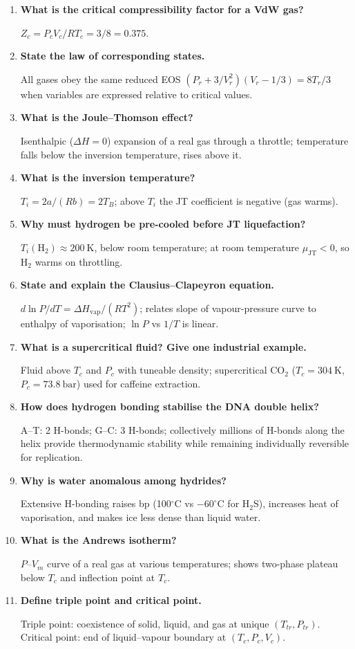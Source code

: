 \documentclass[12pt,a4paper]{article}
\newcommand{\Q}[1]{\textbf{#1}\par\noindent\ignorespaces}
\begin{document}
\begin{tcolorbox}[exambox, title={Frequently Asked / Viva Questions}]
\begin{enumerate}[topsep=0pt, label=\textbf{Q\arabic*.}, itemsep=5pt]
  \item \Q{What is the critical compressibility factor for a VdW gas?}
    $Z_c = P_cV_c/RT_c = 3/8 = 0.375$.
  \item \Q{State the law of corresponding states.}
    All gases obey the same reduced EOS $(P_r+3/V_r^2)(V_r-1/3) = 8T_r/3$ when variables are expressed relative to critical values.
  \item \Q{What is the Joule--Thomson effect?}
    Isenthalpic ($\Delta H=0$) expansion of a real gas through a throttle; temperature falls below the inversion temperature, rises above it.
  \item \Q{What is the inversion temperature?}
    $T_i = 2a/(Rb) = 2T_B$; above $T_i$ the JT coefficient is negative (gas warms).
  \item \Q{Why must hydrogen be pre-cooled before JT liquefaction?}
    $T_i(\mathrm{H_2}) \approx 200\ \mathrm{K}$, below room temperature; at room temperature $\mu_{\mathrm{JT}} < 0$, so H$_2$ warms on throttling.
  \item \Q{State and explain the Clausius--Clapeyron equation.}
    $d\ln P/dT = \Delta H_{\mathrm{vap}}/(RT^2)$; relates slope of vapour-pressure curve to enthalpy of vaporisation; $\ln P$ vs $1/T$ is linear.
  \item \Q{What is a supercritical fluid? Give one industrial example.}
    Fluid above $T_c$ and $P_c$ with tuneable density; supercritical $\mathrm{CO_2}$ ($T_c=304\ \mathrm{K}$, $P_c=73.8\ \mathrm{bar}$) used for caffeine extraction.
  \item \Q{How does hydrogen bonding stabilise the DNA double helix?}
    A--T: 2 H-bonds; G--C: 3 H-bonds; collectively millions of H-bonds along the helix provide thermodynamic stability while remaining individually reversible for replication.
  \item \Q{Why is water anomalous among hydrides?}
    Extensive H-bonding raises bp (100$^\circ$C vs $-60^\circ$C for H$_2$S), increases heat of vaporisation, and makes ice less dense than liquid water.
  \item \Q{What is the Andrews isotherm?}
    $P$--$V_m$ curve of a real gas at various temperatures; shows two-phase plateau below $T_c$ and inflection point at $T_c$.
  \item \Q{Define triple point and critical point.}
    Triple point: coexistence of solid, liquid, and gas at unique $(T_{tr},P_{tr})$. Critical point: end of liquid--vapour boundary at $(T_c,P_c,V_c)$.
\end{enumerate}
\end{tcolorbox}
\end{document}
